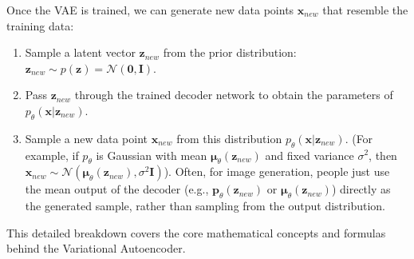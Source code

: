 \documentclass[11pt, letterpaper]{article}
\newcommand{\vx}{\boldsymbol{x}} %
\newcommand{\vz}{\boldsymbol{z}} %
\newcommand{\vmu}{\boldsymbol{\mu}} %
\newcommand{\mI}{\boldsymbol{I}} %
\newcommand{\Ndist}{\mathcal{N}} %
\begin{document}
Once the VAE is trained, we can generate new data points $\vx_{new}$ that resemble the training data:
\begin{enumerate}
    \item Sample a latent vector $\vz_{new}$ from the prior distribution: $\vz_{new} \sim p(\vz) = \Ndist(\mathbf{0}, \mI)$.
    \item Pass $\vz_{new}$ through the trained decoder network to obtain the parameters of $p_{\theta}(\vx|\vz_{new})$.
    \item Sample a new data point $\vx_{new}$ from this distribution $p_{\theta}(\vx|\vz_{new})$. (For example, if $p_{\theta}$ is Gaussian with mean $\vmu_{\theta}(\vz_{new})$ and fixed variance $\sigma^2$, then $\vx_{new} \sim \Ndist(\vmu_{\theta}(\vz_{new}), \sigma^2\mI)$). Often, for image generation, people just use the mean output of the decoder (e.g., $\boldsymbol{p}_{\theta}(\vz_{new})$ or $\vmu_{\theta}(\vz_{new})$) directly as the generated sample, rather than sampling from the output distribution.
\end{enumerate}

This detailed breakdown covers the core mathematical concepts and formulas behind the Variational Autoencoder.

\end{document}
